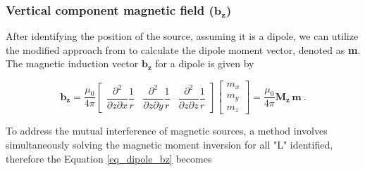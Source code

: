 
\subsubsection{Vertical component magnetic field ($\mathbf{b_z}$)}\label{section_bz}
After identifying the position of the source, assuming it is a dipole, we can utilize the modified approach from \citet{Oliveira2015Estimation} to calculate the dipole moment vector, denoted as 
\textbf{m}. The magnetic induction vector $\mathbf{b_z}$ for a dipole is given by

\begin{equation}
\label{eq_dipole_bz}
\mathbf{b_z}
= \dfrac{\mu_0}{4\pi}
\begin{bmatrix}
\dfrac{\partial^2}{\partial z \partial x} \dfrac{1}{r}
& \dfrac{\partial^2}{\partial z \partial y} \dfrac{1}{r}
& \dfrac{\partial^2}{\partial z \partial z} \dfrac{1}{r}
\end{bmatrix}
\begin{bmatrix}
m_x \\ m_y \\ m_z
\end{bmatrix}
= \dfrac{\mu_0}{4\pi} \mathbf{M_z}\,\mathbf{m}
\ .
\end{equation}

To address the mutual interference of magnetic sources, a method involves simultaneously solving the magnetic moment inversion for all "L" identified, therefore the Equation \ref{eq_dipole_bz} becomes


